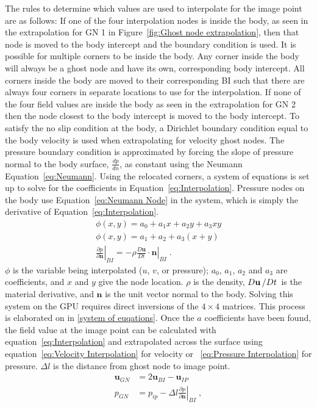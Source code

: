 The rules to determine which values are used to interpolate for the image point are as follows:
If one of the four interpolation nodes is inside the body, as seen in the extrapolation for GN 1 in Figure~\ref{fig:Ghost node extrapolation}, then that node is moved to the body intercept and the boundary condition is used. 
It is possible for multiple corners to be inside the body. 
Any corner inside the body will always be a ghost node and have its own, corresponding body intercept. 
All corners inside the body are moved to their corresponding BI such that there are always four corners in separate locations to use for the interpolation. 
If none of the four field values are inside the body as seen in the extrapolation for GN 2 then the node closest to the body intercept is moved to the body intercept.
To satisfy the no slip condition at the body, a Dirichlet boundary condition equal to the body velocity is used when extrapolating for velocity ghost nodes. 
The pressure boundary condition is approximated by forcing the slope of pressure normal to the body surface, $\frac{dp}{dn}$, as constant using the Neumann Equation~\eqref{eq:Neumann}. 
Using the relocated corners, a system of equations is set up to solve for the coefficients in Equation~\eqref{eq:Interpolation}.
Pressure nodes on the body use Equation~\eqref{eq:Neumann Node} in the system, which is simply the derivative of Equation~\eqref{eq:Interpolation}. 
\begin{align}
\phi (x,y) = a_0 + a_1 x + a_2y + a_3 x y \label{eq:Interpolation} \\
\phi (x,y) = a_1 + a_2 + a_3 (x+y) \label{eq:Neumann Node} \\
\left. \frac{\partial p}{\partial \textbf{n}}\right|_{BI} = \left. -\rho \frac{D\textbf{u}}{Dt}\cdot \textbf{n}\right|_{BI}
\label{eq:Neumann}\;.
\end{align}
$\phi$ is the variable being interpolated ($u$, $v$, or pressure); $a_0$, $a_1$, $a_2$ and $a_3$ are coefficients, and $x$ and $y$ give the node location.
$\rho$ is the density, $D\textbf{u}\left/Dt\right.$ is the material derivative, and $\textbf{n}$ is the unit vector normal to the body.
Solving this system on the GPU requires direct inversions of the $4 \times 4$ matrices.
This process is elaborated on in \ref{system of euqations}. 
Once the $a$ coefficients have been found, the field value at the image point can be calculated with equation~\eqref{eq:Interpolation} and extrapolated across the surface using equation~\eqref{eq:Velocity Interpolation} for velocity or ~\eqref{eq:Pressure Interpolation} for pressure. 
$\Delta l$ is the distance from ghost node to image point.
\begin{align}
\textbf{u}_{GN} &= 2\textbf{u}_{BI} - \textbf{u}_{IP} \label{eq:Velocity Interpolation} \\
p_{GN} &= p_{ip} - \Delta l \left. \frac{\partial p}{\partial \textbf{n}}\right|_{BI} \;, \label{eq:Pressure Interpolation}
\end{align}

